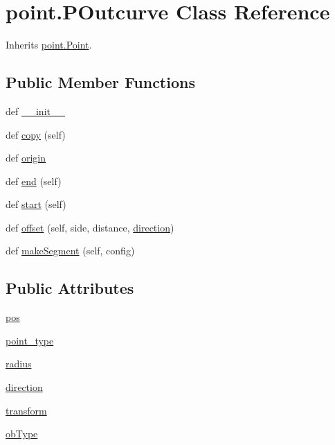 \hypertarget{classpoint_1_1_p_outcurve}{}\section{point.\+P\+Outcurve Class Reference}
\label{classpoint_1_1_p_outcurve}


Inherits \hyperlink{classpoint_1_1_point}{point.\+Point}.

\subsection*{Public Member Functions}
\begin{DoxyCompactItemize}
\item 
def \hyperlink{classpoint_1_1_p_outcurve_a58bf27c16d951f13b6f3d5405319983e}{\+\_\+\+\_\+init\+\_\+\+\_\+}
\item 
def \hyperlink{classpoint_1_1_p_outcurve_a90ee64579962293144941631d9367a42}{copy} (self)
\item 
def \hyperlink{classpoint_1_1_p_outcurve_a50530cf0ac62c3981d546f449ead9416}{origin}
\item 
def \hyperlink{classpoint_1_1_p_outcurve_af7ac3d99aa94780f5de641b505ba0c76}{end} (self)
\item 
def \hyperlink{classpoint_1_1_p_outcurve_aa211f73705ba4dec6fa352e6ac438d8d}{start} (self)
\item 
def \hyperlink{classpoint_1_1_p_outcurve_affa6746bf64924da6a97a91921d9bec2}{offset} (self, side, distance, \hyperlink{classpoint_1_1_p_outcurve_aaf8b3c62f842baf778b96ec5282498a3}{direction})
\item 
def \hyperlink{classpoint_1_1_p_outcurve_aad0382d8d7abb33b86928fc55877545d}{make\+Segment} (self, config)
\end{DoxyCompactItemize}
\subsection*{Public Attributes}
\begin{DoxyCompactItemize}
\item 
\hyperlink{classpoint_1_1_p_outcurve_a272d155a477a41ad7a917162447aa9cf}{pos}
\item 
\hyperlink{classpoint_1_1_p_outcurve_a43b2f03d671dad564b6e2e44af19ecd4}{point\+\_\+type}
\item 
\hyperlink{classpoint_1_1_p_outcurve_ab3da10b0f1738c4ba0ed1e8000bd1c13}{radius}
\item 
\hyperlink{classpoint_1_1_p_outcurve_aaf8b3c62f842baf778b96ec5282498a3}{direction}
\item 
\hyperlink{classpoint_1_1_p_outcurve_af0f9106c1983ccfd7d513d9475d83e76}{transform}
\item 
\hyperlink{classpoint_1_1_p_outcurve_a1055fb24d6bde1dfa85f69655f2371b3}{ob\+Type}
\end{DoxyCompactItemize}


